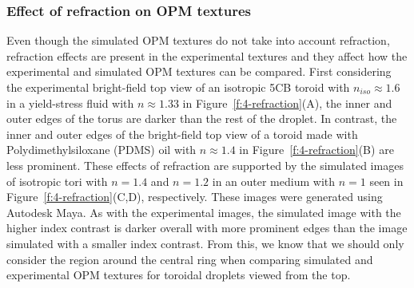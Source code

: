 \subsubsection{Effect of refraction on OPM textures}
Even though the simulated OPM textures do not take into account refraction, refraction effects are present in the experimental textures and they affect how the experimental and simulated OPM textures can be compared.
First considering the experimental bright-field top view of an isotropic 5CB toroid with $n_{iso} \approx 1.6 $ in a yield-stress fluid with $n \approx 1.33$ in Figure~\ref{f:4-refraction}(A), the inner and outer edges of the torus are darker than the rest of the droplet.
In contrast, the inner and outer edges of the bright-field top view of a toroid made with Polydimethylsiloxane (PDMS) oil with $n \approx 1.4$ in Figure~\ref{f:4-refraction}(B) are less prominent.
These effects of refraction are supported by the simulated images of isotropic tori with $n = 1.4$ and $n = 1.2$ in an outer medium with $n=1$ seen in Figure~\ref{f:4-refraction}(C,D), respectively.
These images were generated using Autodesk Maya.
As with the experimental images, the simulated image with the higher index contrast is darker overall with more prominent edges than the image simulated with a smaller index contrast.
From this, we know that we should only consider the region around the central ring when comparing simulated and experimental OPM textures for toroidal droplets viewed from the top.

